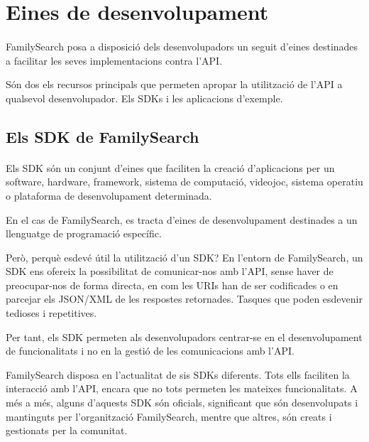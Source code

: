 \section{Eines de desenvolupament}

    \paragraph{}
    FamilySearch posa a disposició dels desenvolupadors un seguit d'eines destinades a facilitar les seves implementacions contra l'API.

    Són dos els recursos principals que permeten apropar la utilització de l'API a qualsevol desenvolupador. Els SDKs i les aplicacions d'exemple.

    \subsection{Els SDK de FamilySearch}

        \paragraph{}
        Els \gls{SDK} són un conjunt d'eines que faciliten la creació d'aplicacions per un software, hardware, framework, sistema de computació, videojoc, sistema operatiu o plataforma de desenvolupament determinada.

        En el cas de FamilySearch, es tracta d'eines de desenvolupament destinades a un llenguatge de programació específic.

        Però, perquè esdevé útil la utilització d'un SDK? En l'entorn de FamilySearch, un SDK ens ofereix la possibilitat de comunicar-nos amb l'API, sense haver de preocupar-nos de forma directa, en com les URIs han de ser codificades o en parcejar els JSON/XML de les respostes retornades. Tasques que poden esdevenir tedioses i repetitives.

        Per tant, els SDK permeten als desenvolupadors centrar-se en el desenvolupament de funcionalitats i no en la gestió de les comunicacions amb l'API.

        FamilySearch disposa en l'actualitat de sis SDKs diferents. Tots ells faciliten la interacció amb l'API, encara que no tots permeten les mateixes funcionalitats. A més a més, alguns d'aquests SDK són oficials, significant que són desenvolupats i mantinguts per l'organització FamilySearch, mentre que altres, són creats i gestionats per la comunitat.

